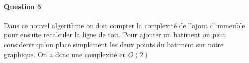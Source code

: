 \documentclass[a4paper,10pt]{article}
\begin{document}
\paragraph{Question 5}
Dans ce nouvel algorithme on doit compter la complexité de l'ajout d'immeuble pour ensuite recalculer la ligne de toit.
Pour ajouter un batiment on peut considerer qu'on place simplement les deux points du batiment sur notre graphique. 
On a donc une complexité en $O(2)$
\end{document}
